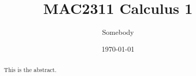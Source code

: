 \documentclass{xourse}
\title{MAC2311 Calculus 1}
\author{Somebody}
\date{\today}
\begin{document}
\begin{abstract}
	This is the abstract.
\end{abstract}

\maketitle

\tableofcontents
{}
\end{document}
